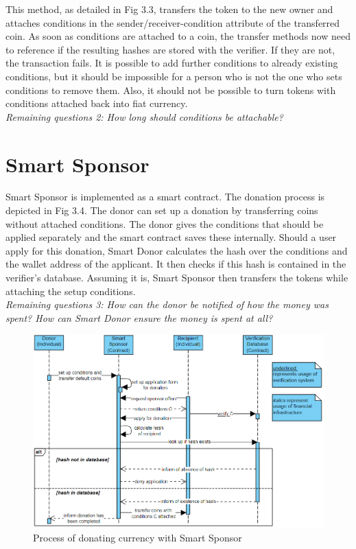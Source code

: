 This method, as detailed in Fig 3.3, transfers the token to the new owner and attaches conditions in the sender/receiver-condition attribute of the transferred coin.
As soon as conditions are attached to a coin, the transfer methods now need to reference if the resulting hashes are stored with the verifier.
If they are not, the transaction fails. It is possible to add further conditions to already existing conditions, but it should be impossible for a person who is not the one who sets conditions to remove them. Also, it should not be possible to turn tokens with conditions attached back into fiat currency.\\
\emph{Remaining questions 2: How long should conditions be attachable?}
\section*{Smart Sponsor}
Smart Sponsor is implemented as a smart contract. The donation process is depicted in Fig 3.4. The donor can set up a donation by transferring coins without attached conditions. The donor gives the conditions that should be applied separately and the smart contract saves these internally. Should a user apply for this donation, Smart Donor calculates the hash over the conditions and the wallet address of the applicant. It then checks if this hash is contained in the verifier's database. Assuming it is, Smart Sponsor then transfers the tokens while attaching the setup conditions.\\
\emph{Remaining questions 3: How can the donor be notified of how the money was spent? How can Smart Donor ensure the money is spent at all?}
\begin{figure}[H]
    \centering
    \includegraphics[scale=0.45]{figures/Smart Sponsor.png}  
    \caption{Process of donating currency with Smart Sponsor}
    \label{fig:donationModel}
\end{figure}
